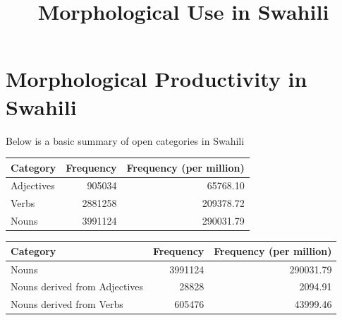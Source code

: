 \documentclass[12pt]{article}\usepackage[]{graphicx}\usepackage[]{color}
\title{Morphological Use in Swahili}
\author{}
\date{}
\begin{document}
\maketitle
\section*{Morphological Productivity in Swahili}










Below is a basic summary of open categories in Swahili
\begin{table}[ht]
\centering
\begin{tabular}{lrr}
  \hline
Category & Frequency & Frequency (per million) \\ 
  \hline
Adjectives & 905034 & 65768.10 \\ 
  Verbs & 2881258 & 209378.72 \\ 
  Nouns & 3991124 & 290031.79 \\ 
   \hline
\end{tabular}
\end{table}


\begin{table}[ht]
\centering
\begin{tabular}{lrr}
  \hline
Category & Frequency & Frequency (per million) \\ 
  \hline
Nouns & 3991124 & 290031.79 \\ 
  Nouns derived from Adjectives & 28828 & 2094.91 \\ 
  Nouns derived from Verbs & 605476 & 43999.46 \\ 
   \hline
\end{tabular}
\end{table}
\end{document}
